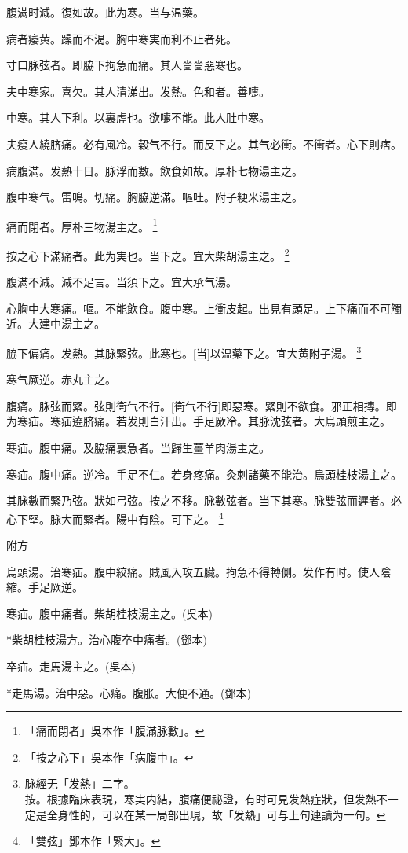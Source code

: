 \documentclass[12pt,twoside,UTF8,b5paper]{ctexbook}
\begin{document}
腹滿时減。復如故。此为寒。当与温藥。

病者痿黄。躁而不渴。胸中寒実而利不止者死。

寸口脉弦者。即脇下拘急而痛。其人嗇嗇惡寒也。

夫中寒家。喜欠。其人清涕出。发熱。色和者。善嚏。

中寒。其人下利。以裏虗也。欲嚏不能。此人肚中寒。

夫瘦人繞脐痛。必有風冷。穀气不行。而反下之。其气必衝。不衝者。心下則痞。

病腹滿。发熱十日。脉浮而數。飲食如故。厚朴七物湯主之。

腹中寒气。雷鳴。切痛。胸脇逆滿。嘔吐。附子粳米湯主之。

痛而閉者。厚朴三物湯主之。
	\footnote{「痛而閉者」吳本作「腹滿脉數」。}

按之心下滿痛者。此为実也。当下之。宜大柴胡湯主之。
	\footnote{「按之心下」吳本作「病腹中」。}

腹滿不減。減不足言。当須下之。宜大承气湯。

心胸中大寒痛。嘔。不能飲食。腹中寒。上衝皮起。出見有頭足。上下痛而不可觸近。大建中湯主之。

脇下偏痛。发熱。其脉緊弦。此寒也。[当]以温藥下之。宜大黄附子湯。
	\footnote{脉經无「发熱」二字。\\按。根據臨床表現，寒実内結，腹痛便祕證，有时可見发熱症狀，但发熱不一定是全身性的，可以在某一局部出現，故「发熱」可与上句連讀为一句。}

寒气厥逆。赤丸主之。

腹痛。脉弦而緊。弦則衛气不行。[衛气不行]即惡寒。緊則不欲食。邪正相摶。即为寒疝。寒疝遶脐痛。若发則白汗出。手足厥冷。其脉沈弦者。大烏頭煎主之。

寒疝。腹中痛。及脇痛裏急者。当歸生薑羊肉湯主之。

寒疝。腹中痛。逆冷。手足不仁。若身疼痛。灸刺諸藥不能治。烏頭桂枝湯主之。

其脉數而緊乃弦。狀如弓弦。按之不移。脉數弦者。当下其寒。脉雙弦而遲者。必心下堅。脉大而緊者。陽中有陰。可下之。
	\footnote{「雙弦」鄧本作「緊大」。}

附方

烏頭湯。治寒疝。腹中絞痛。賊風入攻五臟。拘急不得轉側。发作有时。使人陰縮。手足厥逆。

寒疝。腹中痛者。柴胡桂枝湯主之。(吳本)

*柴胡桂枝湯方。治心腹卒中痛者。(鄧本)

卒疝。走馬湯主之。(吳本)

*走馬湯。治中惡。心痛。腹胀。大便不通。(鄧本)
\end{document}
